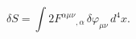 \begin{equation}
\delta S=\int 2F^{\alpha \mu \nu }{}_{,\alpha }\,\delta
\varphi _{\mu \nu}\,d^{4}x . \label{018}
\end{equation}

